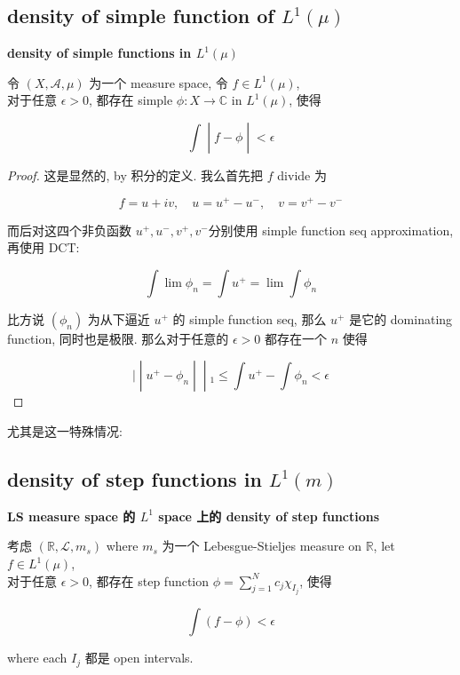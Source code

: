 \documentclass{qlnotes-export}
\begin{document}
\subsection{\texorpdfstring{density of simple function of \(L^{1}(\mu)\)}{density of simple function of L\^{}\{1\}(\textbackslash mu)}}\label{density-of-simple-function-of-l1mu}

\begin{theorem}{\protect{}\label{kn-density-of-simple-functions-in-l-1-mu}{\textbf{density
of simple functions in \(L^{1}(\mu)\)}}}

令 \((X,\mathcal{A},\mu)\) 为一个 measure space, 令 \(f \in L^{1}(\mu)\),\\
对于任意 \(\epsilon > 0\), 都存在 simple \(\phi:X\rightarrow{\mathbb{C}}\) in \(L^{1}(\mu)\), 使得

\[\left. \int \middle| f - \phi \middle| < \epsilon \right.\]

\end{theorem}

\begin{proof}

这是显然的, by 积分的定义. 我么首先把 \(f\) divide 为

\[f = u + iv,\quad u = u^{+} - u^{-},\quad v = v^{+} - v^{-}\]

而后对这四个非负函数 \(u^{+},u^{-},v^{+},v^{-}\)分别使用 simple function seq approximation, 再使用 DCT:

\[\int\lim\phi_{n} = \int u^{+} = \lim\int\phi_{n}\]

比方说 \((\phi_{n})\) 为从下逼近 \(u^{+}\) 的 simple function seq, 那么 \(u^{+}\) 是它的 dominating function, 同时也是极限. 那么对于任意的 \(\epsilon > 0\) 都存在一个 \(n\) 使得

\[\left. | \middle| u^{+} - \phi_{n} \middle| \middle| {}_{1} \leq \int u^{+} - \int\phi_{n} < \epsilon \right.\]

\end{proof}

尤其是这一特殊情况:

\subsection{\texorpdfstring{density of step functions in \(L^{1}(m)\)}{density of step functions in L\^{}\{1\}(m)}}\label{density-of-step-functions-in-l1m}

\begin{theorem}{\protect{}\label{kn-ls-measure-space-l-1-space-density-of-step-functions}{\textbf{LS
measure space 的 \(L^{1}\) space 上的 density of step functions}}}

考虑 \(({\mathbb{R}},\mathcal{L},m_{s})\) where \(m_{s}\) 为一个 Lebesgue-Stieljes measure on \(\mathbb{R}\), let \(f \in L^{1}(\mu)\),\\
对于任意 \(\epsilon > 0\), 都存在 step function \(\phi = \sum_{j = 1}^{N}c_{j}\chi_{I_{j}}\), 使得

\[\int(f - \phi) < \epsilon\]

where each \(I_{j}\) 都是 open intervals.

\end{theorem}
\end{document}
